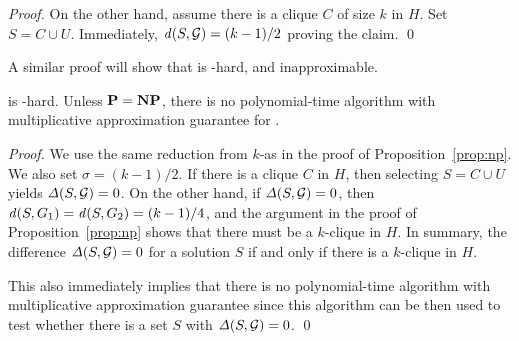 \begin{proof}


On the other hand, assume there is a clique $C$ of size $k$ in $H$.
Set $S = C \cup U$. 
Immediately, $\dens{S, \calG} =   (k - 1)/2$ proving the claim.
\qed
\end{proof}

\iffalse
\begin{proposition}
\label{prop:inapproximability}
\problemcdcsm does not have any polynomial time approximation algorithm with an approximation ratio better than $n^{1-\epsilon}$ for any constant $\epsilon > 0$, unless $\np = \zpp$.
\end{proposition}
\fi

A similar proof will show that \problemcdcsdiff is \np-hard, and inapproximable.

\begin{proposition} 
\label{prop:np2}
\problemcdcsdiff is \np-hard.
Unless $\textbf{P} = \textbf{NP}$, there is no polynomial-time algorithm with multiplicative approximation guarantee for \problemcdcsdiff. 
\end{proposition} 

\begin{proof}
We use the same reduction from $k$-\prbclique as in the proof of Proposition~\ref{prop:np}.
We also set $\sigma = (k - 1)/2$. If there is a clique $C$ in $H$, then selecting $S = C \cup U$ yields $\diff{S, \calG} = 0$.
On the other hand, if $\diff{S, \calG} = 0$, then $\dens{S, G_1} = \dens{S, G_2} = (k - 1)/4$, and the argument in the proof of Proposition~\ref{prop:np} shows that there must be a $k$-clique in $H$.
In summary, the difference $\diff{S, \calG} = 0$ for a solution $S$ if and only if there is a $k$-clique in $H$.

This also immediately implies that there is no polynomial-time algorithm with multiplicative approximation guarantee since this algorithm can be then used to test whether there is a set $S$ with $\diff{S, \calG} = 0$.
\qed
\end{proof}
